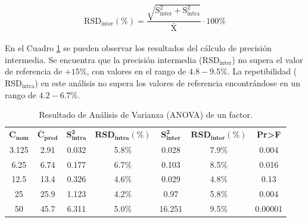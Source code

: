 \documentclass{article}
\begin{document}
\begin{equation}\label{Eq:6}
\mathrm{RSD_{inter}(\%)} = \frac{\sqrt{\mathrm{S^{2}_{inter}}+\mathrm{S^{2}_{intra}}}}{\bar{\mathrm{X}}}\cdot 100\%
\end{equation}\\

\noindent
En el Cuadro \ref{Cuadro:5} se pueden observar los resultados del cálculo de precisión intermedia. Se encuentra que la precisión intermedia ($\mathrm{RSD_{inter}}$) no supera el valor de referencia de $ +15\% $, con valores en el rango de $4.8-9.5\%$. La repetibilidad ($\mathrm{RSD_{intra}}$) en este análisis no supera los valores de referencia encontrándose en un rango de $4.2-6.7\%$.\\

\begin{table}[H]
	\centering
\begin{tabular}{ccccccc}
	\hline
	\multirow{2}{*}{$\mathbf{C_{nom}}$} & \multirow{2}{*}{$\mathbf{\bar{C}_{pred}}$} & \multirow{2}{*}{$\mathbf{S^{2}_{intra}}$} & \multirow{2}{*}{$\mathbf{RSD_{intra}(\%)}$} & \multirow{2}{*}{$\mathbf{S^{2}_{inter}}$} & \multirow{2}{*}{$\mathbf{RSD_{inter}(\%)}$} & \multirow{2}{*}{\textbf{Pr>F}} \\ 
	 & & & & & & \\ 
	 \hline
	3.125              &           2.91            &          0.032           &           5.8\%            &          0.028           &           7.9\%            &     0.004     \\

	6.25               &           6.74            &          0.177           &           6.7\%            &          0.103           &           8.5\%            &     0.016     \\
	12.5               &           13.4            &          0.326           &           4.6\%            &          0.029           &           4.8\%            &     0.13      \\
	25                 &           25.9            &          1.123           &           4.2\%            &           0.97           &           5.8\%            &     0.004     \\
	50                 &           45.7            &          6.311           &           5.0\%            &          16.251          &           9.5\%            &    0.00001    \\ \hline
\end{tabular} 
\caption{Resultado de Análisis de Varianza (ANOVA) de un factor.}
\label{Cuadro:5}
\end{table}
\end{document}
